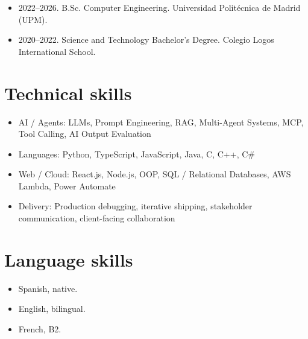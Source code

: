 \documentclass{article}
\begin{document}
\begin{itemize}
    \item 2022--2026. B.Sc. Computer Engineering. Universidad Polit\'ecnica de Madrid (UPM).
    \item 2020--2022. Science and Technology Bachelor's Degree. Colegio Logos International School.
\end{itemize}

\section*{Technical skills}

\begin{itemize}
    \item AI / Agents: LLMs, Prompt Engineering, RAG, Multi-Agent Systems, MCP, Tool Calling, AI Output Evaluation
    \item Languages: Python, TypeScript, JavaScript, Java, C, C++, C\#
    \item Web / Cloud: React.js, Node.js, OOP, SQL / Relational Databases, AWS Lambda, Power Automate
    \item Delivery: Production debugging, iterative shipping, stakeholder communication, client-facing collaboration
\end{itemize}

\section*{Language skills}

\begin{itemize}
    \item Spanish, native.
    \item English, bilingual.
    \item French, B2.
\end{itemize}
\end{document}
